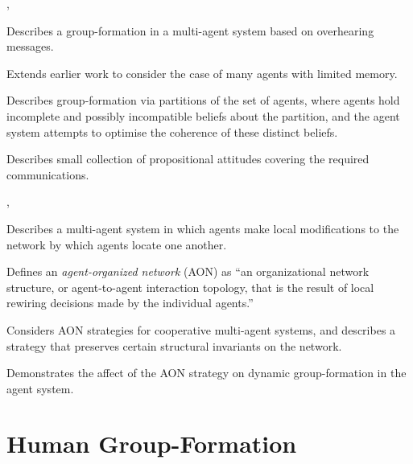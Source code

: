 %

\begin{albResearchNote}{%
    \citet{legras03:_lotto}%
  }{%
    , %
  }
\item Describes a group-formation in a multi-agent system based on
  overhearing messages.
\item Extends earlier work to consider the case of many agents with
  limited memory.
\item Describes group-formation via partitions of the set of agents,
  where agents hold incomplete and possibly incompatible beliefs about
  the partition, and the agent system attempts to optimise the coherence
  of these distinct beliefs.
\item Describes small collection of propositional attitudes covering the
  required communications.
\end{albResearchNote}

%

\begin{albResearchNote}{%
    \citet{gaston05:_agent_organ_networ_dynam_team_format}%
  }{%
    , %
  }
\item Describes a multi-agent system in which agents make local
  modifications to the network by which agents locate one another.
\item Defines an \emph{agent-organized network} (AON) as ``an
  organizational network structure, or agent-to-agent interaction
  topology, that is the result of local rewiring decisions made by the
  individual agents.''
\item Considers AON strategies for cooperative multi-agent systems, and
  describes a strategy that preserves certain structural invariants on
  the network.
\item Demonstrates the affect of the AON strategy on dynamic
  group-formation in the agent system.
\end{albResearchNote}

%
%
%

\section{Human Group-Formation}
\label{sec:read_2007_11_26:human-group-form}

%

